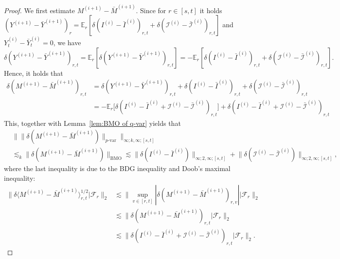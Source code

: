 \documentclass[11pt,reqno]{amsart}
\numberwithin{equation}{section}
\def\E{\mathbb E}
\begin{document}
\begin{proof}
We first estimate $M^{(i+1)} - \bar M^{(i+1)}$. Since for $r \in [s,t]$ it holds $(Y^{(i+1)} - \bar Y^{(i+1)})_r = \E_r [ \delta (I^{(i)} - \bar I^{(i)})_{r,t} + \delta (\mathcal I^{(i)} - \bar{\mathcal I}^{(i)})_{r,t} ]$ and $Y^{(i)}_{t} - \bar Y^{(i)}_{t} = 0$, we have  
\begin{equation*}
\delta (Y^{(i + 1)} - \bar Y^{(i + 1)})_{r,t} = \E_{r} [\delta (Y^{(i+1)} - \bar Y^{(i+1)})_{r,t}] = - \E_{r} \left[ \delta (I^{(i)} - \bar I^{(i)})_{r,t} + \delta (\mathcal I^{(i)} - \bar{\mathcal I}^{(i)})_{r,t} \right].
\end{equation*}
Hence, it holds that 
\begin{equation*}
\begin{aligned}
\delta (M^{(i+1)} - \bar M^{(i + 1)})_{r,t} &= \delta (Y^{(i+1)} - \bar Y^{(i+1)})_{r,t} + \delta (I^{(i)} - \bar I^{(i)})_{r,t} + \delta (\mathcal I^{(i)} - \bar{\mathcal I}^{(i)})_{r,t} \\
& = - \E_{r}\big[ \delta (I^{(i)} - \bar I^{(i)} + \mathcal I^{(i)} - \bar{\mathcal I}^{(i)})_{r,t} \big] + \delta (I^{(i)} - \bar I^{(i)} + \mathcal I^{(i)} - \bar{\mathcal I}^{(i)})_{r,t}
\end{aligned}
\end{equation*}
This, together with Lemma~\ref{lem:BMO of q-var}  yields that 
\begin{equation}\label{e:esti for M^n,m'}
\begin{aligned}
&\big\| \|\delta (M^{(i+1)} - \bar M^{(i + 1)})\|_{p\text{-}\mathrm{var}} \big\|_{\infty;k,\infty;[s,t]}  \\ 
&\lesssim_k \|\delta (M^{(i+1)} - \bar M^{(i + 1)})\|_{\mathrm{BMO}} \lesssim \big\| \delta (I^{(i)} - \bar I^{(i)}) \big\|_{\infty;2,\infty;[s,t]} + \big\| \delta (\mathcal I^{(i)} - \bar{\mathcal I}^{(i)}) \big\|_{\infty;2,\infty;[s,t]},
\end{aligned}
\end{equation}
where the last inequality is due to the BDG inequality and Doob's maximal inequality: 
\begin{equation*}
\begin{aligned}
\big\|\delta \langle M^{(i + 1)} - \bar M^{(i + 1)} \rangle^{1/2}_{r,t} \big| \mathcal F_r \big\|_{2} &\lesssim \big\|\sup_{v\in[r,t]} |\delta (M^{(i + 1)} - \bar M^{(i + 1)})_{r,v}| \big| \mathcal F_r \big\|_{2}\\
&\lesssim  \big\| \delta (M^{(i + 1)} - \bar M^{(i + 1)})_{r,t} \big| \mathcal F_r \big\|_{2} \\
&\lesssim 
\big\| \delta (I^{(i)} - \bar I^{(i)} + \mathcal I^{(i)} - \bar{\mathcal I}^{(i)})_{r,t} |\mathcal F_r \big\|_{2}.
\end{aligned}
\end{equation*}
 

\end{proof}
\end{document}
